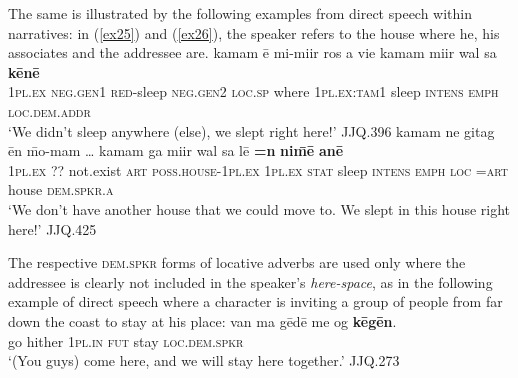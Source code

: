 \documentclass[output=paper
,modfonts
,nonflat]{langsci/langscibook}
\begin{document}
\noindent
The same is illustrated by the following examples from direct speech within narratives: in (\ref{ex25}) and (\ref{ex26}), the speaker refers to the house where he, his associates and the addressee are. 
\ea	\label{ex25}
\gll		kamam 	\=e 			mi-mi{\textquotesingle}ir 	ros 		a 			vie				kamam 		mi{\textquotesingle}ir 	wal 	sa 		\textbf{k\=en\=e}		\\
\textsc{1pl.ex}	\textsc{neg.gen1}	\textsc{red-}sleep	\textsc{neg.gen2}	\textsc{loc.sp}	where		\textsc{1pl.ex:tam1}		sleep	\textsc{intens}	\textsc{emph}	\textsc{loc.dem.addr} \\
\glt	`We didn't sleep anywhere (else), we slept right here!'				\hfill{JJQ.396}
\z
\ea	\label{ex26}
\gll		kamam	ne 	gitag 	\=en 	\=mo-mam 					{\ob}\dots{\cb}				kamam ga		mi{\textquotesingle}ir	wal		sa		l\=e		\textbf{=n}	\textbf{ni\=m\=e}		\textbf{an\=e}	\\
\textsc{1pl.ex}	\textsc{??}		not.exist		\textsc{art}	\textsc{poss.house-1pl.ex}		{}	\textsc{1pl.ex}	\textsc{stat}	sleep	\textsc{intens}	\textsc{emph}	\textsc{loc}	\textsc{=art}	house		\textsc{dem.spkr.a}		\\
\glt	`We don't have another house that we could move to. We slept in this house right here!'		\hfill{JJQ.425}
\z

\noindent
The respective \textsc{dem.spkr} forms of locative adverbs are used only where the addressee is clearly not included in the speaker's \textit{here-space}, as in the following example of direct speech where a character is inviting a group of people from far down the coast to stay at his place:
\ea	\label{ex27}
\gll		van 	ma 		g\=ed\=e		me	{\textquotesingle}og \textbf{k\=eg\=en}.		\\
		go		hither		\textsc{1pl.in}	\textsc{fut}	stay	\textsc{loc.dem.spkr}		\\
\glt	`(You guys) come here, and we will stay here together.'		\hfill{JJQ.273}
\z
\end{document}
